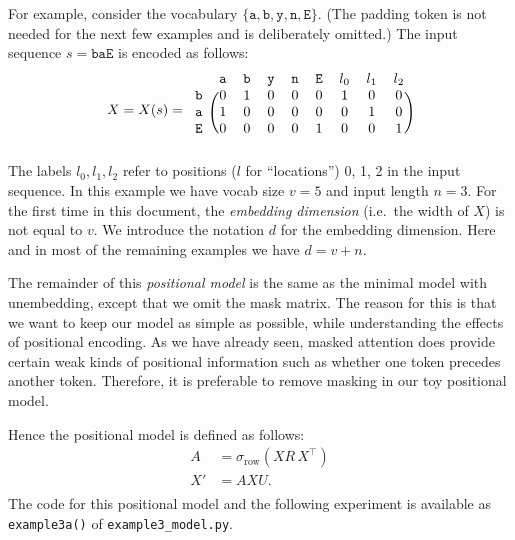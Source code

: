 \documentclass{article}
\newcommand{\ta}{\mathtt{a}}
\newcommand{\tb}{\mathtt{b}}
\newcommand{\tn}{\mathtt{n}}
\newcommand{\ty}{\mathtt{y}}
\newcommand{\tE}{\mathtt{E}}
\newcommand{\Tr}{^{\top}} %
\begin{document}
For example, consider the vocabulary $\{\ta, \tb, \ty, \tn, \tE
\}$. (The padding token is not needed for the next few examples and is
deliberately omitted.) The input sequence $s=\mathtt{baE}$ is encoded as
follows:
\begin{displaymath}
  X = X(s) = 
    \begin{blockarray}{ccccccccc}
       & \ta & \tb & \ty & \tn & \tE & l_0 & l_1 & l_2 \\
      \begin{block}{c(cccccccc)}
        \tb & 0 & 1 & 0 & 0 & 0 & 1 & 0 & 0 \\
        \ta & 1 & 0 & 0 & 0 & 0 & 0 & 1 & 0 \\
        \tE & 0 & 0 & 0 & 0 & 1 & 0 & 0 & 1 \\
      \end{block}
    \end{blockarray}
\end{displaymath}
The labels $l_0, l_1, l_2$ refer to positions ($l$ for ``locations'')
0, 1, 2 in the input sequence. In this example we have vocab size
$v=5$ and input length $n=3$. For the first time in this document, the
\emph{embedding dimension} (i.e.\ the width of $X$) is not equal to
$v$. We introduce the notation $d$ for the embedding dimension. Here
and in most of the remaining examples we have $d=v+n$.

The remainder of this \emph{positional model} is the same as the
minimal model with unembedding, except that we omit the mask
matrix. The reason for this is that we want to keep our model as
simple as possible, while understanding the effects of positional
encoding. As we have already seen, masked attention does provide
certain weak kinds of positional information such as whether one token
precedes another token. Therefore, it is preferable to remove masking
in our toy positional model.

Hence the positional model is defined as follows:
\begin{displaymath}
\begin{aligned}
A &= \sigma_\text{row}(X R\, X\Tr) \\
X'&= A X U.  \\
\end{aligned}
\end{displaymath}
The code for this positional model and the following experiment is
available as \texttt{example3a()} of \texttt{example3\_model.py}.
\end{document}
